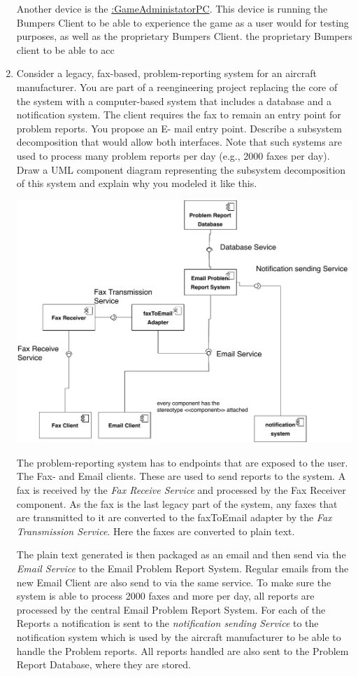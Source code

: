 \documentclass[a4paper, 10pt]{article}
\begin{document}
\begin{enumerate}
    Another device is the \underline{:GameAdministatorPC}. This device is running the Bumpers Client to be able to 
    experience the game as a user would for testing purposes, as well as the proprietary Bumpers Client.
    the proprietary Bumpers client to be able to acc
    \item
    Consider a legacy, fax-based, problem-reporting system for an aircraft manufacturer. 
    You are part of a reengineering project replacing the core of the system with a 
    computer-based system that includes a database and a notification system. 
    The client requires the fax to remain an entry point for problem reports. 
    You propose an E- mail entry point. Describe a subsystem decomposition that would allow 
    both interfaces. Note that such systems are used to process many problem reports per 
    day (e.g., 2000 faxes per day). Draw a UML component diagram representing the 
    subsystem decomposition of this system and explain why you modeled it like this.
    \vspace{0.5cm}

    \includegraphics[width=\linewidth]{task4.pdf}

    The problem-reporting system has to endpoints that are exposed to the user. The Fax- and Email clients. 
    These are used to send reports to the system. A fax is received by the \textit{Fax Receive Service} and 
    processed by the Fax Receiver component. As the fax is the last legacy part of the system, any faxes that are 
    transmitted to it are converted to the faxToEmail adapter by the \textit{Fax Transmission Service}. Here the 
    faxes are converted to plain text.

    The plain text generated is then packaged as an email and then send via the \textit{Email Service} to the
    Email Problem Report System. Regular emails from the new Email Client are also send to via the same service.
    To make sure the system is able to process 2000 faxes and more per day, all reports are processed by the central 
    Email Problem Report System. For each of the Reports a notification is sent to the \textit{notification sending Service} 
    to the notification system which is used by the aircraft manufacturer to be able to handle the Problem reports.
    All reports handled are also sent to the Problem Report Database, where they are stored. 
\end{enumerate}
\end{document}
